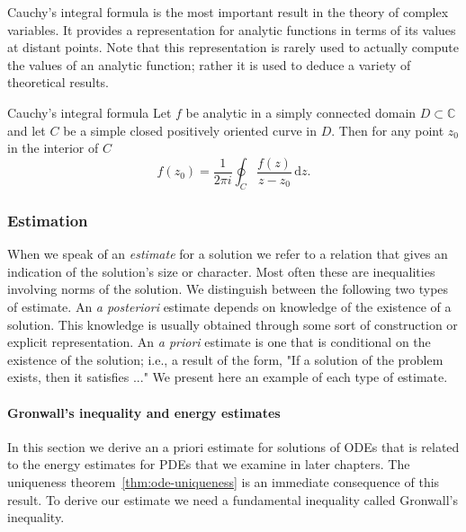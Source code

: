 Cauchy's integral formula is the most important result in the theory of complex variables. It provides a representation for analytic functions in terms of its values at distant points. Note that this representation is rarely used to actually compute the values of an analytic function; rather it is used to deduce a variety of theoretical results.

\begin{Theorem}{Cauchy's integral formula}
\label{thm:cauchy-integral-formula}
Let $f$ be analytic in a simply connected domain $D\subset\mathbb{C}$ and let $C$ be a simple closed positively oriented curve in $D$. Then for any point $z_0$ in the interior of $C$
\begin{equation}\label{eq:cauchy-integral-formula}
f(z_0)=\dfrac{1}{2\pi i}\oint_C\dfrac{f(z)}{z-z_0}\,\mathrm{d}z.
\end{equation}

\end{Theorem}

\subsubsection{Estimation}\label{subsec:estimation}

When we speak of an \emph{estimate} for a solution we refer to a relation that gives an indication of the solution's size or character. Most often these are inequalities involving norms of the solution. We distinguish between the following two types of estimate. An \emph{a posteriori} estimate depends on knowledge of the existence of a solution. This knowledge is usually obtained through some sort of construction or explicit representation. An \emph{a priori} estimate is one that is conditional on the existence of the solution; i.e., a result of the form, "If a solution of the problem exists, then it satisfies ..." We present here an example of each type of estimate.

\paragraph*{Gronwall's inequality and energy estimates}

In this section we derive an a priori estimate for solutions of ODEs that is related to the energy estimates for PDEs that we examine in later chapters. The uniqueness theorem~\ref{thm:ode-uniqueness} is an immediate consequence of this result. To derive our estimate we need a fundamental inequality called Gronwall's inequality.

